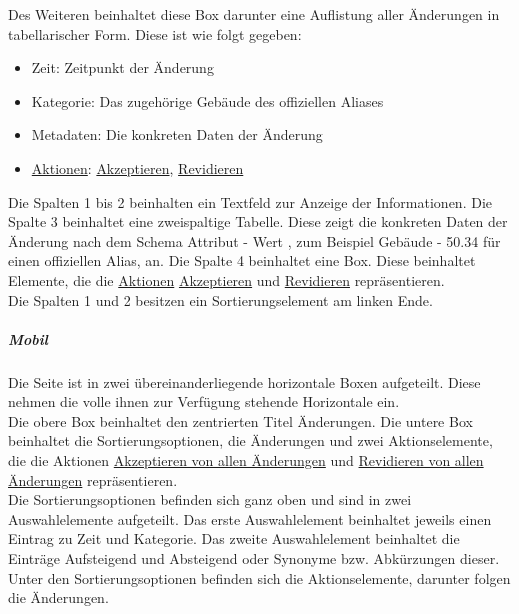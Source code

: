 Des Weiteren beinhaltet diese Box darunter eine Auflistung aller Änderungen in tabellarischer Form. Diese ist wie folgt gegeben:

\begin{itemize}
    \item Zeit: Zeitpunkt der Änderung
    \item Kategorie: Das zugehörige Gebäude des offiziellen Aliases
    \item Metadaten: Die konkreten Daten der Änderung
    \item \hyperref[AP_Aktionen_Anderungen]{Aktionen}: \hyperref[AP_Aktionen_Anderungen_Akzeptieren]{Akzeptieren}, \hyperref[AP_Aktionen_Anderungen_Revidieren]{Revidieren}
\end{itemize}

Die Spalten 1 bis 2 beinhalten ein Textfeld zur Anzeige der Informationen.
Die Spalte 3 beinhaltet eine zweispaltige Tabelle. Diese zeigt die konkreten Daten der Änderung nach dem Schema \dq Attribut - Wert \dq{}, zum Beispiel \dq Gebäude - 50.34 \dq{} für einen offiziellen Alias, an.
Die Spalte 4 beinhaltet eine Box. Diese beinhaltet Elemente, die die \hyperref[AP_Aktionen_Anderungen]{Aktionen} \hyperref[AP_Aktionen_Anderungen_Akzeptieren]{Akzeptieren} und \hyperref[AP_Aktionen_Anderungen_Revidieren]{Revidieren} repräsentieren. \\
Die Spalten 1 und 2 besitzen ein Sortierungselement am linken Ende.

\subparagraph*{Mobil}
Die Seite ist in zwei übereinanderliegende horizontale Boxen aufgeteilt. Diese nehmen die volle ihnen zur Verfügung stehende Horizontale ein. \\
Die obere Box beinhaltet den zentrierten Titel \dq Änderungen\dq.
Die untere Box beinhaltet die Sortierungsoptionen, die Änderungen und zwei Aktionselemente, die die Aktionen \hyperref[AP_Aktionen_Anderungen_Akzeptiere_Alle]{Akzeptieren von allen Änderungen} und \hyperref[AP_Aktionen_Anderungen_Revidiere_Alle]{Revidieren von allen Änderungen} repräsentieren. \\
Die Sortierungsoptionen befinden sich ganz oben und sind in zwei Auswahlelemente aufgeteilt. 
Das erste Auswahlelement beinhaltet jeweils einen Eintrag zu Zeit und Kategorie.
Das zweite Auswahlelement beinhaltet die Einträge \dq Aufsteigend \dq{} und \dq Absteigend \dq{} oder Synonyme bzw. Abkürzungen dieser.\\
Unter den Sortierungsoptionen befinden sich die Aktionselemente, darunter folgen die Änderungen.

